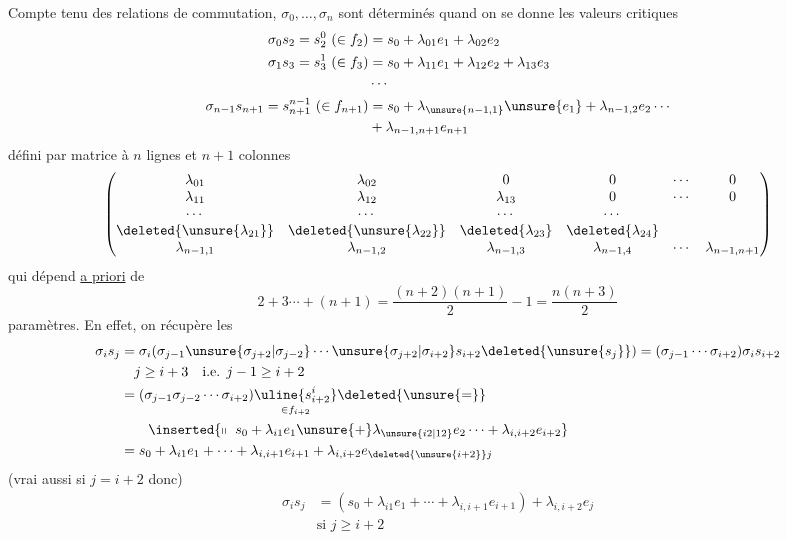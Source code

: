 Compte tenu des relations de commutation, $\sigma_0,\ldots,\sigma_n$ sont déterminés quand on se donne les  valeurs critiques
\[
\begin{aligned}
\sigma_0s_2=s_2^0\ (\in f_2)&=s_0+\lambda_{01}e_1+\lambda_{02}e_2\\
\sigma_1s_3=s_3^1\ (\in f_3)&=s_0+\lambda_{11}e_1+\lambda_{12}e_2+\lambda_{13}e_3\\
&\cdots\\
\sigma_{n-1}s_{n+1}=s_{n+1}^{n-1}\ (\in f_{n+1})&=s_0+\lambda_{\unsure{n-1,1}}\unsure{e_1}+\lambda_{n-1,2}e_2\cdots\\
&+\lambda_{n-1,n+1}e_{n+1}
\end{aligned}
\]
défini par matrice à $n$ lignes et $n+1$ colonnes
\[
\begin{pmatrix}
\lambda_{01}&\lambda_{02}&0&0&\cdots&0\\
\lambda_{11}&\lambda_{12}&\lambda_{13}&0&\cdots&0\\
\cdots&\cdots&\cdots&\cdots&&\\
\deleted{\unsure{\lambda_{21}}}&\deleted{\unsure{\lambda_{22}}}&\deleted{\lambda_{23}}&\deleted{\lambda_{24}}&&\\
\lambda_{n-1,1}&\lambda_{n-1,2}&\lambda_{n-1,3}&\lambda_{n-1,4}&\cdots&\lambda_{n-1,n+1}
\end{pmatrix}
\]
qui dépend \uline{a priori} de
\[
2+3\cdots+(n+1)=\frac{(n+2)(n+1)}{2}-1=\frac{n(n+3)}{2}
\]
paramètres. En effet, on récupère les
\[
\begin{aligned}
\sigma_i s_j&=\sigma_i(\sigma_{j-1}\unsure{\sigma_{j+2}|\sigma_{j-2}}\cdots\unsure{\sigma_{j+2}|\sigma_{i+2}}s_{i+2}\deleted{\unsure{s_j}})=(\sigma_{j-1}\cdots\sigma_{i+2})\sigma_i s_{i+2}\\
&\quad j\geq i+3\quad\text{i.e. }j-1\geq i+2\\
&=(\sigma_{j-1}\sigma_{j-2}\cdots\sigma_{i+2})\underset{\in f_{i+2}}{\uline{s_{i+2}^i}}\deleted{\unsure{=}}\\
&\qquad\inserted{\shortparallel\ s_0+\lambda_{i1}e_1\unsure{+}\lambda_{\unsure{i2|12}}e_2\cdots+\lambda_{i,i+2}e_{i+2}}\\
&=s_0+\lambda_{i1}e_1+\cdots+\lambda_{i,i+1}e_{i+1}+\lambda_{i,i+2}e_{\deleted{\unsure{i+2}}j}
\end{aligned}
\]
(vrai aussi si $j=i+2$ donc)
\[
\boxed{\begin{aligned}
\sigma_i s_j&=(s_0+\lambda_{i1}e_1+\cdots+\lambda_{i,i+1}e_{i+1})+\lambda_{i,i+2}e_j\\
&\text{si }j\geq i+2
\end{aligned}}
\]
